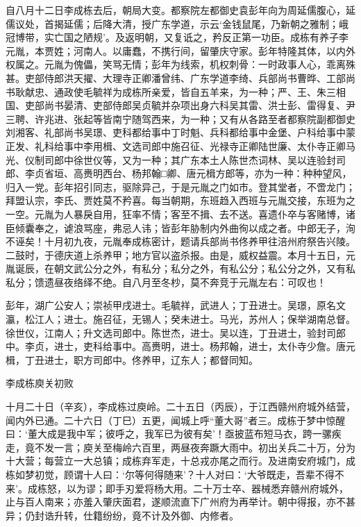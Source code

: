 \documentclass[]{article}
\begin{document}
自八月十二日李成栋去后，朝局大变。都察院左都御史袁彭年向为周延儒腹心，延儒议处，首揭延儒；后降大清，授广东学道，示云`金钱鼠尾，乃新朝之雅制；峨冠博带，实亡国之陋规'。及返明朝，又复诋之，矜反正第一功臣。成栋有养子李元胤，本贾姓；河南人。以庸蠢，不携行间，留肇庆守家。彭年特隆其体，以内外权属之。元胤为傀儡，笑骂无情；彭年为线索，机权刺骨：一时政事人心，乖离殊甚。吏部侍郎洪天擢、大理寺正卿潘曾纬、广东学道李绮、兵部尚书曹晔、工部尚书耿献忠、通政使毛毓祥为成栋所亲爱，皆自五羊来，为一种；严、王、朱三相国、吏部尚书晏清、吏部侍郎吴贞毓并杂项出身六科吴其雷、洪士彭、雷得复、尹三聘、许兆进、张起等皆南宁随驾西来，为一种；又有从各路至者都察院副都御史刘湘客、礼部尚书吴璟、吏科都给事中丁时魁、兵科都给事中金堡、户科给事中蒙正发、礼科给事中李用楫、文选司郎中施召征、光禄寺正卿陆世廉、太仆寺正卿马光、仪制司郎中徐世仪等，又为一种；其广东本土人陈世杰词林、吴以连验封司郎、李贞省垣、高赉明西台、杨邦翰□卿、唐元楫方郎等，亦为一种：种种望风，归入一党。彭年招引同志，驱除异己，于是元胤之门如市。登其堂者，不啻龙门；拜盟认宗，李氏、贾姓莫不矜喜。每当朝期，东班趋入西班与元胤交接，东班为之一空。元胤为人暴戾自用，狂率不情；客至不揖、去不送。喜遗仆卒与客赌博，诸臣倾囊奉之，谑浪骂座，弗忌人讳；皆彭年胁制内外曲徇以成之者。中郎无子，洵不诬矣！十月初九夜，元胤奉成栋密计，题请兵部尚书佟养甲往涪州府祭告兴陵。二鼓时，于德庆道上杀养甲；地方官以盗杀报。由是，威权益震。本月十五日，元胤诞辰，在朝文武公分之外，有私分；私分之外，有私公分；私公分之外，又有私私分；馈遗昼夜络绎不绝。自八月至冬杪，莫不奔竞于元胤左右：可叹也！

彭年，湖广公安人；崇祯甲戌进士。毛毓祥，武进人；丁丑进士。吴璟，原名文瀛，松江人；进士。施召征，无锡人；癸未进士。马光，苏州人；保举湖南总督。徐世仪，江南人；升文选司郎中。陈世杰，进士。吴以连，丁丑进士，验封司郎中。李贞，进士，吏科给事中。高赉明，进士。杨邦翰，进士，太仆寺少詹。唐元楫，丁丑进士，职方司郎中。佟养甲，辽东人；都督同知。

李成栋庾关初败

十月二十日（辛亥），李成栋过庾岭。二十五日（丙辰），于江西赣州府城外结营，闻内外已通。二十六日（丁巳）五更，闻城上呼``董大哥''者三。成栋于梦中惊醒曰：`董大成是我中军；彼呼之，我军已为彼有矣'！亟披蓝布短马衣，跨一骡疾走，竟不发一言；庾关至梅岭六百里，两昼夜奔蹶大雨中。初出关兵二十万，分为十大营；每营立一大总镇；成栋弃军走，十总戎亦尾之而行。及进南安府城门，成栋如梦初觉，顾谓十人曰：`尔等何得随来'？十人对曰：`大爷既走，吾辈不得不来'。成栋怒，以为谬；即手刃爱将杨大用。二十万士卒、器械悉弃赣州府城外，止与百人南来；亦羞入肇庆面君，遂顺流直下广州府为再举计。朝中得报，亦不甚异；仍封诰升转，仕籍纷纷，竟不计及外御、内修者。
\end{document}
